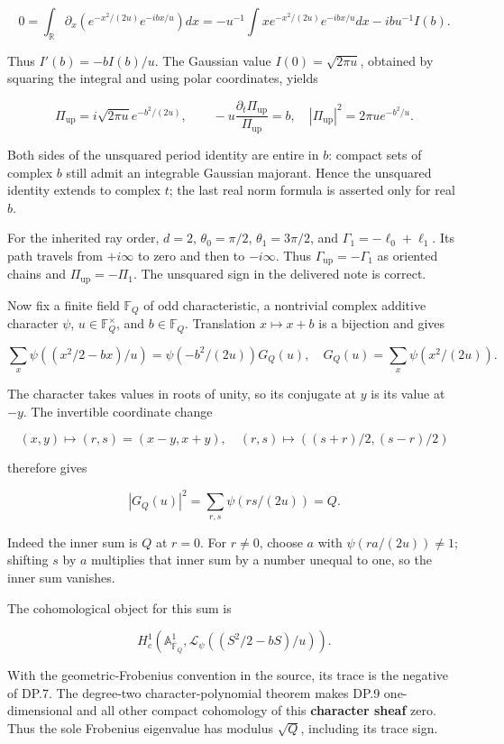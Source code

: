 \[
0=\int_{\mathbb R}\partial_x
       (e^{-x^2/(2u)}e^{-ibx/u})dx
=-u^{-1}\int x e^{-x^2/(2u)}e^{-ibx/u}dx
 -ibu^{-1}I(b).
\]

Thus \(I'(b)=-bI(b)/u\). The Gaussian value \(I(0)=\sqrt{2\pi u}\), obtained by squaring the integral and using polar coordinates, yields

\[
\Pi_{\mathrm{up}}=i\sqrt{2\pi u}
 e^{-b^2/(2u)},\qquad
-u\frac{\partial_t\Pi_{\mathrm{up}}}{\Pi_{\mathrm{up}}}=b,
\quad |\Pi_{\mathrm{up}}|^2=2\pi u e^{-b^2/u}.
\tag{DP.6}
\]

Both sides of the unsquared period identity are entire in \(b\): compact sets of complex \(b\) still admit an integrable Gaussian majorant. Hence the unsquared identity extends to complex \(t\); the last real norm formula is asserted only for real \(b\).

For the inherited ray order, \(d=2\), \(\theta_0=\pi/2\), \(\theta_1=3\pi/2\), and \(\Gamma_1=-\ell_0+\ell_1\). Its path travels from \(+i\infty\) to zero and then to \(-i\infty\). Thus \(\Gamma_{\mathrm{up}}=-\Gamma_1\) as oriented chains and \(\Pi_{\mathrm{up}}=-\Pi_1\). The unsquared sign in the delivered note is correct.

Now fix a finite field \(\mathbb F_Q\) of odd characteristic, a nontrivial complex additive character \(\psi\), \(u\in\mathbb F_Q^\times\), and \(b\in\mathbb F_Q\). Translation \(x\mapsto x+b\) is a bijection and gives

\[
\sum_x\psi((x^2/2-bx)/u)
=\psi(-b^2/(2u))G_Q(u),
\quad G_Q(u)=\sum_x\psi(x^2/(2u)).
\tag{DP.7}
\]

The character takes values in roots of unity, so its conjugate at \(y\) is its value at \(-y\). The invertible coordinate change

\[
(x,y)\mapsto(r,s)=(x-y,x+y),
\quad (r,s)\mapsto((s+r)/2,(s-r)/2)
\]

therefore gives

\[
|G_Q(u)|^2=\sum_{r,s}\psi(rs/(2u))=Q.
\tag{DP.8}
\]

Indeed the inner sum is \(Q\) at \(r=0\). For \(r\ne0\), choose \(a\) with \(\psi(ra/(2u))\ne1\); shifting \(s\) by \(a\) multiplies that inner sum by a number unequal to one, so the inner sum vanishes.

The cohomological object for this sum is

\[
H_c^1(\mathbb A^1_{\overline{\mathbb F}_Q},
 \mathcal L_{\psi}((S^2/2-bS)/u)).
\tag{DP.9}
\]

With the geometric-Frobenius convention in the source, its trace is the negative of DP.7. The degree-two character-polynomial theorem makes DP.9 one-dimensional and all other compact cohomology of this \textbf{character sheaf} zero. Thus the sole Frobenius eigenvalue has modulus \(\sqrt Q\), including its trace sign.

